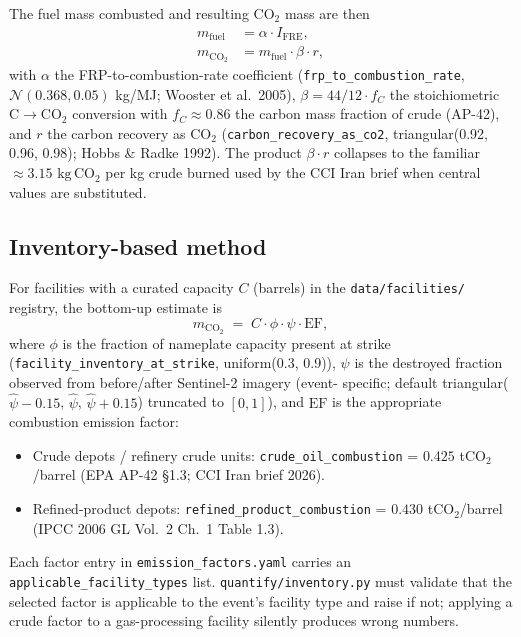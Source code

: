 \documentclass[11pt]{article}
\begin{document}
The fuel mass combusted and resulting $\mathrm{CO_2}$ mass are then
\begin{align}
m_{\mathrm{fuel}} &= \alpha \cdot I_{\mathrm{FRE}},
\label{eq:fuel}\\
m_{\mathrm{CO_2}} &= m_{\mathrm{fuel}} \cdot \beta \cdot r,
\label{eq:co2-frp}
\end{align}
with $\alpha$ the FRP-to-combustion-rate coefficient
(\texttt{frp\_to\_combustion\_rate}, $\mathcal{N}(0.368, 0.05)$ kg/MJ;
Wooster et al.\ 2005), $\beta = 44/12 \cdot f_C$ the stoichiometric
$\mathrm{C}\!\to\!\mathrm{CO_2}$ conversion with $f_C \approx 0.86$ the
carbon mass fraction of crude (AP-42), and $r$ the carbon recovery as
$\mathrm{CO_2}$ (\texttt{carbon\_recovery\_as\_co2},
triangular(0.92, 0.96, 0.98); Hobbs \& Radke 1992). The product
$\beta \cdot r$ collapses to the familiar $\approx 3.15$
$\mathrm{kg\,CO_2}$ per kg crude burned used by the CCI Iran brief
when central values are substituted.

\subsection{Inventory-based method}
\label{sec:inventory}

For facilities with a curated capacity $C$ (barrels) in the
\texttt{data/facilities/} registry, the bottom-up estimate is
\begin{equation}
m_{\mathrm{CO_2}} \;=\; C \cdot \phi \cdot \psi \cdot \mathrm{EF},
\label{eq:co2-inv}
\end{equation}
where $\phi$ is the fraction of nameplate capacity present at strike
(\texttt{facility\_inventory\_at\_strike}, uniform(0.3, 0.9)), $\psi$ is
the destroyed fraction observed from before/after Sentinel-2 imagery (event-
specific; default triangular($\hat\psi - 0.15$, $\hat\psi$, $\hat\psi + 0.15$)
truncated to $[0, 1]$), and $\mathrm{EF}$ is the appropriate combustion
emission factor:

\begin{itemize}
\item Crude depots / refinery crude units:
  \texttt{crude\_oil\_combustion} = $0.425$ tCO$_2$/barrel (EPA AP-42
  \S1.3; CCI Iran brief 2026).
\item Refined-product depots: \texttt{refined\_product\_combustion}
  = $0.430$ tCO$_2$/barrel (IPCC 2006 GL Vol.\ 2 Ch.\ 1 Table 1.3).
\end{itemize}

Each factor entry in \texttt{emission\_factors.yaml} carries an
\texttt{applicable\_facility\_types} list. \texttt{quantify/inventory.py}
must validate that the selected factor is applicable to the event's
facility type and raise if not; applying a crude factor to a gas-processing
facility silently produces wrong numbers.
\end{document}
